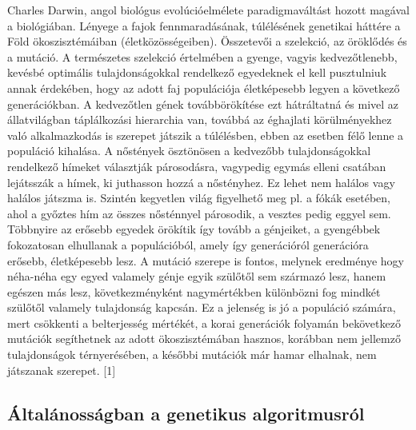 \documentclass[12pt,a4paper]{report}
\begin{document}
Charles Darwin, angol biológus evolúcióelmélete paradigmaváltást hozott magával a biológiában. 
Lényege a fajok fennmaradásának, túlélésének genetikai háttére a Föld ökoszisztémáiban 
(életközösségeiben). Összetevői a szelekció, az öröklődés és a mutáció. A természetes 
szelekció értelmében a gyenge, vagyis kedvezőtlenebb, kevésbé optimális tulajdonságokkal 
rendelkező egyedeknek el kell pusztulniuk annak érdekében, hogy az adott faj populációja 
életképesebb legyen a következő generációkban. A kedvezőtlen gének továbbörökítése ezt
hátráltatná és mivel az állatvilágban táplálkozási hierarchia van, továbbá az éghajlati 
körülményekhez való alkalmazkodás is szerepet játszik a túlélésben, ebben az esetben félő 
lenne a populáció kihalása. A nőstények ösztönösen a kedvezőbb tulajdonságokkal rendelkező 
hímeket választják párosodásra, vagypedig egymás elleni csatában lejátsszák a hímek, ki 
juthasson hozzá a nőstényhez. Ez lehet nem halálos vagy halálos játszma is. Szintén kegyetlen 
világ figyelhető meg pl. a fókák esetében, ahol a győztes hím az összes nősténnyel párosodik, 
a vesztes pedig eggyel sem. Többnyire az erősebb egyedek örökítik így tovább a génjeiket, a
gyengébbek fokozatosan elhullanak a populációból, amely így generációról generációra erősebb,
életképesebb lesz. A mutáció szerepe is fontos, melynek eredménye hogy néha-néha egy egyed
valamely génje egyik szülőtől sem származó lesz, hanem egészen más lesz, következményként
nagymértékben különbözni fog mindkét szülőtől valamely tulajdonság kapcsán. Ez a jelenség is 
jó a populáció számára, mert csökkenti a belterjesség mértékét, a korai generációk folyamán
bekövetkező mutációk segíthetnek az adott ökoszisztémában hasznos, korábban nem jellemző
tulajdonságok térnyerésében, a későbbi mutációk már hamar elhalnak, nem játszanak szerepet. [1]

\subsection{Általánosságban a genetikus algoritmusról}
\end{document}
